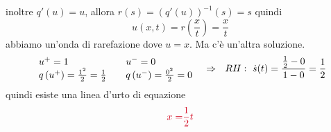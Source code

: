 \documentclass[10pt,a4paper,twoside,openright]{book}
\begin{document}
\begin{figure}[H]
\end{figure}
\FloatBarrier

inoltre $q'( u) =u$, allora $r( s) =( q'( u))^{-1}( s) =s$ quindi
\begin{equation*}
	u( x,t) =r\left(\frac{x}{t}\right) =\frac{x}{t}
\end{equation*}
abbiamo un'onda di rarefazione dove $u=x$. Ma c'è un'altra soluzione.
\begin{equation*}
	\begin{array}{ l l l }
		u^{+} =1                                           &   & u^{-} =0                                 \\
		q\left( u^{+}\right) =\frac{1^{2}}{2} =\frac{1}{2} &   & q\left( u^{-}\right) =\frac{0^{2}}{2} =0 
	\end{array} \ \ \Rightarrow \ \ RH:\ \dot{s}( t) =\frac{\frac{1}{2} -0}{1-0} =\frac{1}{2}
\end{equation*}
quindi esiste una linea d'urto di equazione
\begin{equation}
	\textcolor[rgb]{0.82,0.01,0.11}{x=}\textcolor[rgb]{0.82,0.01,0.11}{\frac{1}{2}}\textcolor[rgb]{0.82,0.01,0.11}{t}
\end{equation}
\end{document}
